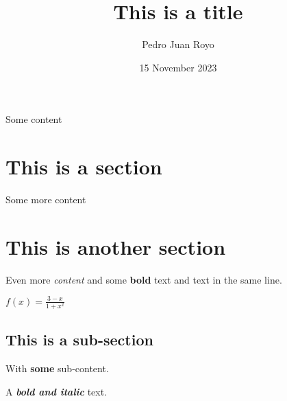 \documentclass[12pt,a4paper]{article}
\title{This is a title}
\author{Pedro Juan Royo}
\date{15 November 2023}
\begin{document}
\maketitle


Some content

\section{This is a section}

Some more content

\section{This is another section}

Even more \textit{content} and some \textbf{bold} text and
text in the same line.

$f(x) = \frac{3-x}{1+x^2}$

\subsection{This is a sub-section}

With \textbf{some} sub-content.

A \textbf{\textit{bold and italic}} text.
\end{document}
